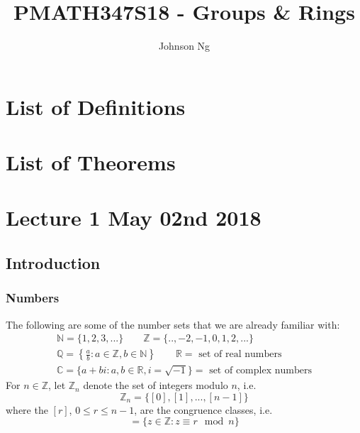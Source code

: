 \documentclass[notoc,notitlepage]{tufte-book}
\title{PMATH347S18 - Groups \& Rings}
\author{Johnson Ng}
\begin{document}
\hypersetup{pageanchor=false}
\maketitle
\hypersetup{pageanchor=true}
\tableofcontents

\chapter*{List of Definitions}

\chapter*{List of Theorems}

\chapter{Lecture 1 May 02nd 2018}
  \label{chapter:lecture_1_may_02nd_2018}

\section{Introduction} %
\label{sec:introduction}

\subsection{Numbers} %
\label{sub:numbers}

The following are some of the number sets that we are already familiar with:
\begin{gather*}
  \mathbb{N} = \{1, 2, 3, ...\} \qquad \mathbb{Z} = \{.., -2, -1, 0, 1, 2, ...\} \\
  \mathbb{Q} = \left\{\frac{a}{b} : a \in \mathbb{Z}, b \in \mathbb{N} \right\} \qquad \mathbb{R} = \text{ set of real numbers} \\
  \mathbb{C} = \{a + bi : a, b \in \mathbb{R}, i = \sqrt{-1} \} = \text{ set of complex numbers} 
\end{gather*}
For $n \in \mathbb{Z}$, let $\mathbb{Z}_n$ denote the set of integers modulo $n$, i.e.
\begin{equation*}
  \mathbb{Z}_n = \{ [0], [1], ..., [n - 1] \}
\end{equation*}
where the $[r]$, $0 \leq r \leq n - 1$, are the congruence classes, i.e.
\begin{equation*}
  [r] = \{z \in \mathbb{Z} : z \equiv r \mod n\}
\end{equation*}
\end{document}

